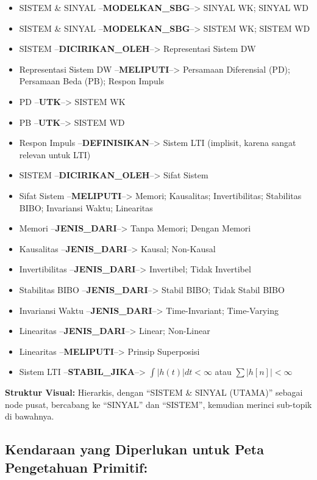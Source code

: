 \documentclass[
  letterpaper,
  DIV=11,
  numbers=noendperiod]{scrreprt}
\providecommand{\tightlist}{%
  \setlength{\itemsep}{0pt}\setlength{\parskip}{0pt}}
\begin{document}
\begin{itemize}
\tightlist
\item
  SISTEM \& SINYAL --\textbf{MODELKAN\_SBG}--\textgreater{} SINYAL WK;
  SINYAL WD
\item
  SISTEM \& SINYAL --\textbf{MODELKAN\_SBG}--\textgreater{} SISTEM WK;
  SISTEM WD
\item
  SISTEM --\textbf{DICIRIKAN\_OLEH}--\textgreater{} Representasi Sistem
  DW
\item
  Representasi Sistem DW --\textbf{MELIPUTI}--\textgreater{} Persamaan
  Diferensial (PD); Persamaan Beda (PB); Respon Impuls
\item
  PD --\textbf{UTK}--\textgreater{} SISTEM WK
\item
  PB --\textbf{UTK}--\textgreater{} SISTEM WD
\item
  Respon Impuls --\textbf{DEFINISIKAN}--\textgreater{} Sistem LTI
  (implisit, karena sangat relevan untuk LTI)
\item
  SISTEM --\textbf{DICIRIKAN\_OLEH}--\textgreater{} Sifat Sistem
\item
  Sifat Sistem --\textbf{MELIPUTI}--\textgreater{} Memori; Kausalitas;
  Invertibilitas; Stabilitas BIBO; Invariansi Waktu; Linearitas
\item
  Memori --\textbf{JENIS\_DARI}--\textgreater{} Tanpa Memori; Dengan
  Memori
\item
  Kausalitas --\textbf{JENIS\_DARI}--\textgreater{} Kausal; Non-Kausal
\item
  Invertibilitas --\textbf{JENIS\_DARI}--\textgreater{} Invertibel;
  Tidak Invertibel
\item
  Stabilitas BIBO --\textbf{JENIS\_DARI}--\textgreater{} Stabil BIBO;
  Tidak Stabil BIBO
\item
  Invariansi Waktu --\textbf{JENIS\_DARI}--\textgreater{}
  Time-Invariant; Time-Varying
\item
  Linearitas --\textbf{JENIS\_DARI}--\textgreater{} Linear; Non-Linear
\item
  Linearitas --\textbf{MELIPUTI}--\textgreater{} Prinsip Superposisi
\item
  Sistem LTI --\textbf{STABIL\_JIKA}--\textgreater{}
  \(\int |h(t)| dt < \infty\) atau \(\sum |h[n]| < \infty\)
\end{itemize}

\textbf{Struktur Visual:} Hierarkis, dengan ``SISTEM \& SINYAL (UTAMA)''
sebagai node pusat, bercabang ke ``SINYAL'' dan ``SISTEM'', kemudian
merinci sub-topik di bawahnya.

\subsection{Kendaraan yang Diperlukan untuk Peta Pengetahuan
Primitif:}\label{kendaraan-yang-diperlukan-untuk-peta-pengetahuan-primitif}
\end{document}
